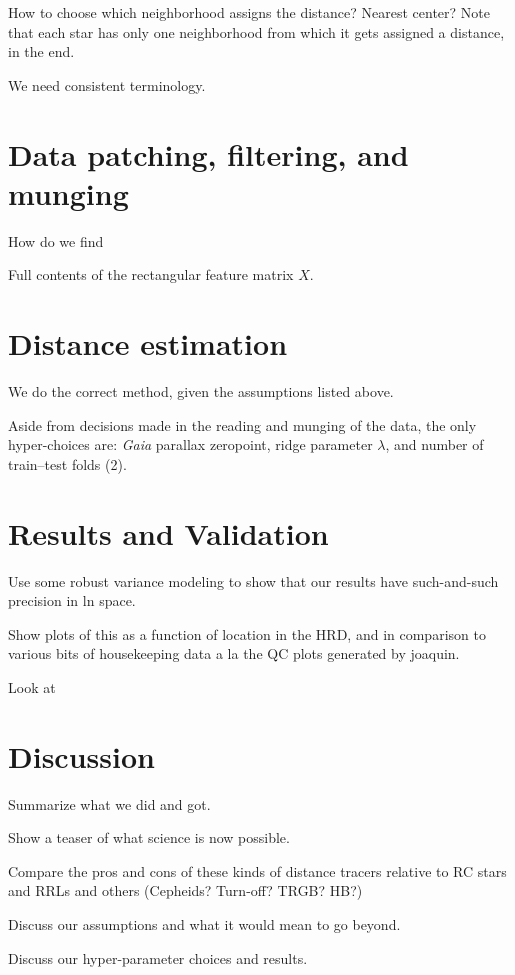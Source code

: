 \documentclass[modern]{aastex631}
\newcommand{\project}[1]{\textsl{#1}}
\newcommand{\Gaia}{\project{Gaia}}
\begin{document}
How to choose which neighborhood assigns the distance? Nearest center? Note that each star has only one neighborhood from which it gets assigned a distance, in the end.

We need consistent terminology.

\section{Data patching, filtering, and munging}

How do we find

Full contents of the rectangular feature matrix $X$.

\section{Distance estimation}

We do the correct method, given the assumptions listed above.

Aside from decisions made in the reading and munging of the data, the
only hyper-choices are: \Gaia{} parallax zeropoint, ridge parameter
$\lambda$, and number of train--test folds (2).

\section{Results and Validation}

Use some robust variance modeling to show that our results have such-and-such precision in ln space.

Show plots of this as a function of location in the HRD, and in comparison to various bits of housekeeping data a la the QC plots generated by joaquin.

Look at 

\section{Discussion}

Summarize what we did and got.

Show a teaser of what science is now possible.

Compare the pros and cons of these kinds of distance tracers relative
to RC stars and RRLs and others (Cepheids? Turn-off? TRGB? HB?)

Discuss our assumptions and what it would mean to go beyond.

Discuss our hyper-parameter choices and results.
\end{document}
